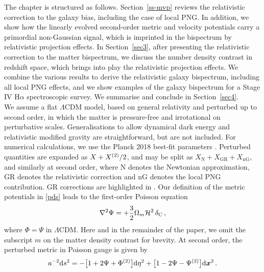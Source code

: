 The chapter is structured as follows. Section~\ref{ss-mvp} reviews the relativistic correction to the 
galaxy bias, including  the case of local PNG. In addition, we show how the linearly evolved second-order metric and velocity potentials carry a primordial non-Gaussian signal, which is imprinted in the bispectrum by relativistic projection effects. In Section~\ref{sec3}, after presenting the relativistic correction to the matter bispectrum, we discuss the number density contrast in redshift space, which brings into play the relativistic projection effects. We combine the various results to derive the relativistic galaxy bispectrum, including all local PNG effects, and we show examples of the galaxy bispectrum for a Stage IV H$\alpha$ spectroscopic survey. We summarise and conclude in Section~\ref{sec4}.
%
~\\  
%
We assume  a flat $\Lambda$CDM model, based on general relativity and perturbed up to second order, in which the matter is pressure-free and irrotational on perturbative scales. Generalisations to allow dynamical dark energy and relativistic modified gravity are straightforward, but are not included. For numerical calculations, we use the Planck 2018 best-fit parameters \cite{Aghanim:2018eyx}.
Perturbed quantities are expanded as
$X+X^{{(2)}}/2$, and may be split as  $X_{\mathrm{N}}+X_{\mathrm{GR}}+X_{\mathrm{nG}}$, 
and similarly at second order, where N denotes the Newtonian approximation, GR denotes the relativistic correction and  nG denotes the local PNG contribution. {GR corrections are highlighted in .}
%
Our definition of the metric potentials in \eqref{pds} leads to the first-order Poisson equation 
\begin{equation} \label{pe1}
\nabla^2 \Psi= + \frac{3}{2}\Omega_m{\cal H}^2\,\delta_{\mathrm{C}} \,,
\end{equation}
where  $ \Phi= \Psi$ in $\Lambda$CDM. Here and in the remainder of the paper, we omit the subscript $m$ on the matter density contrast for brevity.
At second order, the perturbed metric in Poisson gauge is given by
\begin{equation} \label{pds2}
a^{-2}\mathrm{d} s^2=-\big[1+2\Psi + \Phi^{{(2)}}\big]\mathrm{d} \eta^2+ \big[1-2\Psi -  \Psi^{{(2)}}\big]\mathrm{d} \bm {x}^2\,.
\end{equation}
%
%
%
